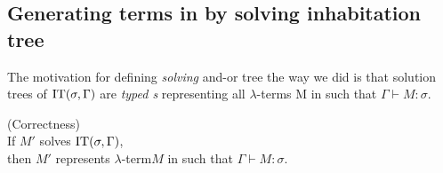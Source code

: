 \documentclass[12pt,a4paper]{report}
\newcommand{\lterm}{$\lambda$-term\xspace}
\newcommand{\lterms}{$\lambda$-terms\xspace}
\newcommand{\turst}[3]{$#1\vdash{}#2:#3$\xspace}
\newcommand{\GMS}{\turst{\Gamma}{M}{\sigma}}
\begin{document}
\newpage
\subsection{ Generating terms in \lnf by solving inhabitation tree }

The motivation for defining \textit{solving} and-or tree the way we did is that
solution trees of $\mathop{\mathrm{IT}}(\sigma,\Gamma)$ are  
\textit{typed \sexprTree{}s} representing all \lterms M in \lnf such that \GMS.


\begin{proposition}
\label{gram-it-prop}
(Correctness)\\
If \sexprTree $M'$ solves $\mathop{\mathrm{IT}}(\sigma,\Gamma)$,\\ 
then $M'$ represents \lterm $M$ in \lnf such that \GMS. 
\end{proposition}
\end{document}

